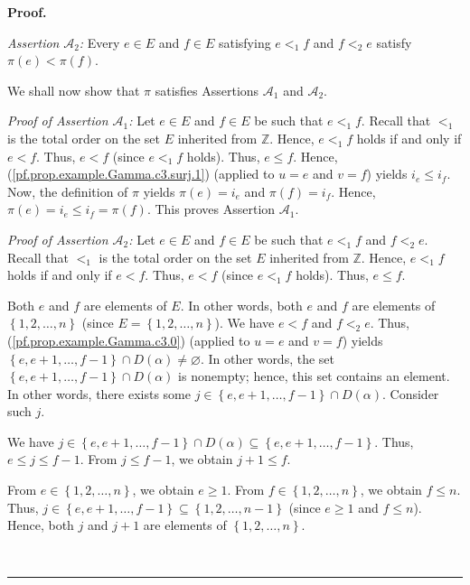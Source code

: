\documentclass[numbers=enddot,12pt,final,onecolumn,notitlepage,abstracton]{scrartcl}
\theoremstyle{definition}
\newenvironment{proof}[1][Proof]{\noindent\textbf{#1.} }{\ \rule{0.5em}{0.5em}}
\newenvironment{verlong}{}{}
\begin{document}
\begin{verlong}
\begin{footnotesize}
\begin{proof}
{\par
\textit{Assertion }$\mathcal{A}_{2}$\textit{:} Every $e\in E$ and $f\in E$
satisfying $e<_{1}f$ and $f<_{2}e$ satisfy $\pi\left(  e\right)  <\pi\left(
f\right)  $.
\par
We shall now show that $\pi$ satisfies Assertions $\mathcal{A}_{1}$ and
$\mathcal{A}_{2}$.
\par
\textit{Proof of Assertion $\mathcal{A}$}$_{1}$\textit{:} Let $e\in E$ and
$f\in E$ be such that $e<_{1}f$. Recall that $<_{1}$ is the total order on the
set $E$ inherited from $\mathbb{Z}$. Hence, $e<_{1}f$ holds if and only if
$e<f$. Thus, $e<f$ (since $e<_{1}f$ holds). Thus, $e\leq f$. Hence,
(\ref{pf.prop.example.Gamma.c3.surj.1}) (applied to $u=e$ and $v=f$) yields
$i_{e}\leq i_{f}$. Now, the definition of $\pi$ yields $\pi\left(  e\right)
=i_{e}$ and $\pi\left(  f\right)  =i_{f}$. Hence, $\pi\left(  e\right)
=i_{e}\leq i_{f}=\pi\left(  f\right)  $. This proves Assertion $\mathcal{A}%
_{1}$.
\par
\textit{Proof of Assertion $\mathcal{A}$}$_{2}$\textit{:} Let $e\in E$ and
$f\in E$ be such that $e<_{1}f$ and $f<_{2}e$. Recall that $<_{1}$ is the
total order on the set $E$ inherited from $\mathbb{Z}$. Hence, $e<_{1}f$ holds
if and only if $e<f$. Thus, $e<f$ (since $e<_{1}f$ holds). Thus, $e\leq f$.
\par
Both $e$ and $f$ are elements of $E$. In other words, both $e$ and $f$ are
elements of $\left\{  1,2,\ldots,n\right\}  $ (since $E=\left\{
1,2,\ldots,n\right\}  $). We have $e<f$ and $f<_{2}e$. Thus,
(\ref{pf.prop.example.Gamma.c3.0}) (applied to $u=e$ and $v=f$) yields
$\left\{  e,e+1,\ldots,f-1\right\}  \cap D\left(  \alpha\right)
\neq\varnothing$. In other words, the set $\left\{  e,e+1,\ldots,f-1\right\}
\cap D\left(  \alpha\right)  $ is nonempty; hence, this set contains an
element. In other words, there exists some $j\in\left\{  e,e+1,\ldots
,f-1\right\}  \cap D\left(  \alpha\right)  $. Consider such $j$.
\par
We have $j\in\left\{  e,e+1,\ldots,f-1\right\}  \cap D\left(  \alpha\right)
\subseteq\left\{  e,e+1,\ldots,f-1\right\}  $. Thus, $e\leq j\leq f-1$. From
$j\leq f-1$, we obtain $j+1\leq f$.
\par
From $e\in\left\{  1,2,\ldots,n\right\}  $, we obtain $e\geq1$. From
$f\in\left\{  1,2,\ldots,n\right\}  $, we obtain $f\leq n$. Thus,
$j\in\left\{  e,e+1,\ldots,f-1\right\}  \subseteq\left\{  1,2,\ldots
,n-1\right\}  $ (since $e\geq1$ and $f\leq n$). Hence, both $j$ and $j+1$ are
elements of $\left\{  1,2,\ldots,n\right\}  $.
}
\end{proof}
\end{footnotesize}
\end{verlong}
\end{document}

